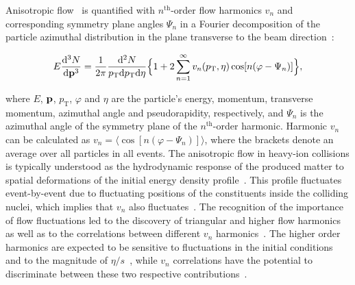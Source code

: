 Anisotropic flow~\cite{Ollitrault:1992bk} is quantified with $n^{\mathrm{th}}$-order flow harmonics $v_n$ and corresponding symmetry plane angles $\Psi_n$ in a Fourier decomposition of the particle azimuthal distribution in the plane transverse to the beam direction~\cite{Voloshin:1994mz,Poskanzer:1998yz}:

\begin{equation}
E\frac{\mathrm{d}^3N}{\mathrm{d}\bold{p}^3} = \frac{1}{2\pi}\frac{\mathrm{d}^2N}{p_{\mathrm{T}}\mathrm{d}p_{\mathrm{T}}\mathrm{d}\eta} \Big\{1 + 2\sum_{n=1}^{\infty} v_n(p_{\mathrm{T}},\eta) \cos[n(\varphi - \Psi_n)]\Big\},
\label{Eq:Fourier}
\end{equation}

\noindent where $E$, $\bold{p}$, $p_{\mathrm{T}}$, $\varphi$ and $\eta$ are the particle's energy, momentum, transverse momentum, azimuthal angle and pseudorapidity, respectively, and $\Psi_n$ is the azimuthal angle of the symmetry plane of the $n^{\mathrm{th}}$-order harmonic. Harmonic $v_n$ can be calculated as $v_{n} = \langle{\cos[n(\varphi - \Psi_n)]}\rangle$, where the brackets denote an average over all particles in all events.
The anisotropic flow in heavy-ion collisions is typically understood as the hydrodynamic response of the produced matter to spatial deformations of the initial energy density profile~\cite{Floerchinger:2013tya}.
This profile fluctuates event-by-event due to fluctuating positions of the constituents inside the colliding nuclei, which implies that $v_n$ also fluctuates~\cite{Miller:2003kd,Alver:2006wh}.
The recognition of the importance of flow fluctuations led to the discovery of triangular and higher flow harmonics~\cite{Alver:2010gr,ALICE:2011ab} as well as to the correlations between different $v_{n}$ harmonics~\cite{Niemi:2012aj,Aad:2014fla}.
The higher order harmonics are expected to be sensitive to fluctuations in the initial conditions and to the magnitude of $\eta/s$~\cite{Alver:2010dn,Luzum:2012wu}, while $v_{n}$ correlations have the potential to discriminate between these two respective contributions~\cite{Niemi:2012aj}.

